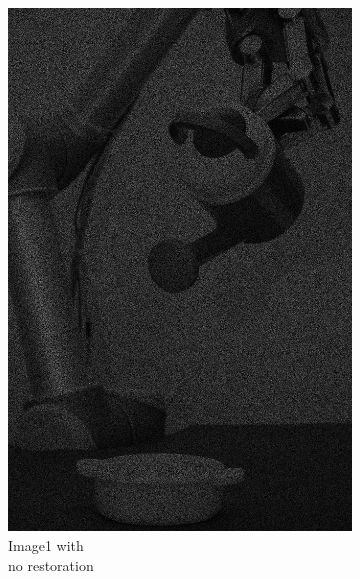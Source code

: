 \begin{figure}[H]
    \centering
    \begin{subfigure}[b]{0.27\textwidth}
        \includegraphics[width=\textwidth]{img1/Image1.png}
        \caption{Image1 with \\no restoration}
    \end{subfigure}
    \begin{subfigure}[b]{0.27\textwidth}

\end{subfigure}
\end{figure}
